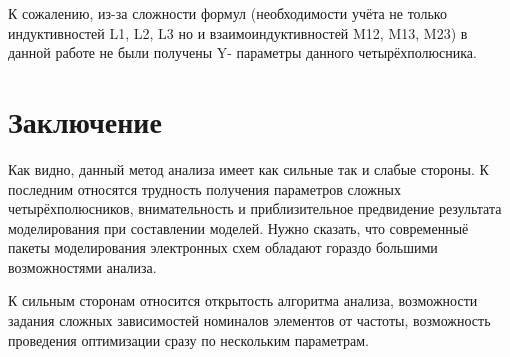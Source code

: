 К  сожалению,  из-за  сложности  формул  (необходимости  учёта  не только  индуктивностей  L1, L2, L3  но  и  взаимоиндуктивностей  M12,  M13, M23)  в  данной  работе  не  были  получены  Y-  параметры  данного четырёхполюсника. 



 
\section*{Заключение}

Как  видно,  данный  метод  анализа  имеет  как  сильные  так  и  слабые стороны. К последним относятся трудность получения параметров сложных четырёхполюсников,  внимательность  и  приблизительное  предвидение результата  моделирования  при  составлении  моделей.  Нужно  сказать,  что современныё  пакеты  моделирования  электронных  схем  обладают  гораздо 
большими возможностями анализа.  

К  сильным  сторонам  относится  открытость  алгоритма  анализа, возможности  задания  сложных  зависимостей  номиналов  элементов  от частоты,  возможность  проведения  оптимизации  сразу  по  нескольким параметрам. 











